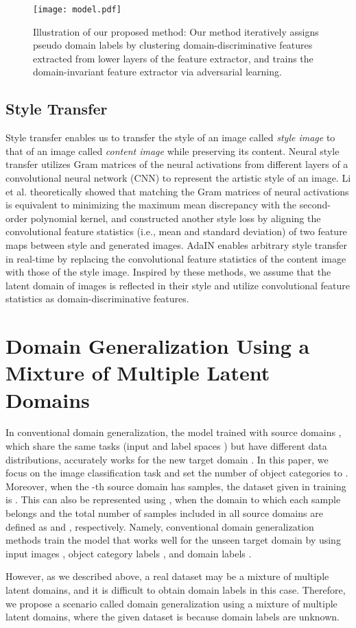 \documentclass[letterpaper]{article} \usepackage{aaai20}  \usepackage{times}  \usepackage{helvet} \usepackage{courier}  \usepackage[hyphens]{url}  \usepackage{graphicx} \urlstyle{rm} \def\UrlFont{\rm}  \usepackage{graphicx}  \usepackage[whole]{bxcjkjatype}
\begin{document}
\begin{figure*}[t]
\centering
\texttt{[image: model.pdf]}
\caption{Illustration of our proposed method: Our method iteratively assigns pseudo domain labels by clustering domain-discriminative features extracted from lower layers of the feature extractor, and trains the domain-invariant feature extractor via adversarial learning.}
\label{fig:model}
\end{figure*}

\subsection{Style Transfer}
Style transfer enables us to transfer the style of an image called \textit{style image} to that of an image called \textit{content image} while preserving its content. Neural style transfer \cite{Gatys} utilizes Gram matrices of the neural activations from different layers of a convolutional neural network (CNN) to represent the artistic style of an image. Li et al. \cite{Li} theoretically showed that matching the Gram matrices of neural activations is equivalent to minimizing the maximum mean discrepancy with the second-order polynomial kernel, and constructed another style loss by aligning the convolutional feature statistics (i.e., mean and standard deviation) of two feature maps between style and generated images.
AdaIN \cite{AdaIN} enables arbitrary style transfer in real-time by replacing the convolutional feature statistics of the content image with those of the style image.
Inspired by these methods, we assume that the latent domain of images is reflected in their style and utilize convolutional feature statistics as domain-discriminative features.

\section{Domain Generalization Using a Mixture of Multiple Latent Domains}
In conventional domain generalization, the model trained with  source domains , which share the same tasks (input  and label spaces ) but have different data distributions, accurately works for the new target domain . In this paper, we focus on the image classification task and set the number of object categories to . Moreover, when the -th source domain  has  samples, the dataset given in training is .
This can also be represented using , when the domain to which each sample belongs and the total number of samples included in all source domains are defined as  and , respectively. Namely, conventional domain generalization methods train the model that works well for the unseen target domain by using input images , object category labels , and domain labels .\par
However, as we described above, a real dataset may be a mixture of multiple latent domains, and it is difficult to obtain domain labels in this case. Therefore, we propose a scenario called domain generalization using a mixture of multiple latent domains, where the given dataset is  because domain labels  are unknown.\par
\end{document}
